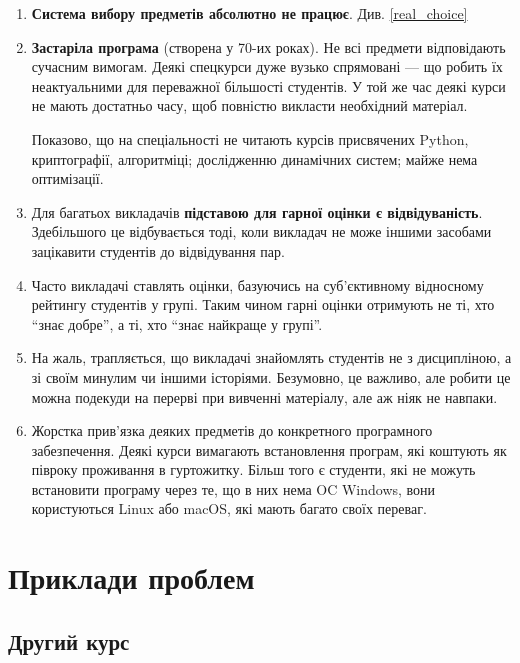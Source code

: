 \documentclass[14pt, a4paper]{extarticle}  %
\begin{document}
\begin{enumerate}
    \item \textbf{Система вибору предметів абсолютно не працює}. Див. \ref{real_choice}
    
    \item \textbf{Застаріла програма} (створена у 70-их роках). Не всі предмети відповідають сучасним вимогам. Деякі спецкурси дуже вузько спрямовані --- що робить їх неактуальними для переважної більшості студентів. У той же час деякі курси не мають достатньо часу, щоб повністю викласти необхідний матеріал. 
    
    Показово, що на спеціальності не читають курсів присвячених Python, криптографії, алгоритміці; дослідженню динамічних систем; майже нема оптимізації. 
    
    \item  Для багатьох викладачів \textbf{підставою для гарної оцінки є відвідуваність}. Здебільшого це відбувається тоді, коли викладач не може іншими засобами зацікавити студентів до відвідування пар. 
    
    \item Часто викладачі ставлять оцінки, базуючись на суб'єктивному відносному рейтингу студентів у групі. Таким чином гарні оцінки отримують не ті, хто ``знає добре'', а ті, хто ``знає найкраще у групі''.
    
    \item На жаль, трапляється, що викладачі знайомлять студентів не з дисципліною, а зі своїм минулим чи іншими історіями. Безумовно, це важливо, але робити це можна подекуди на перерві при вивченні матеріалу, але аж ніяк не навпаки.
    
    \item Жорстка прив'язка деяких предметів до конкретного програмного забезпечення. Деякі курси вимагають встановлення програм, які коштують як півроку проживання в гуртожитку. Більш того є студенти, які не можуть встановити програму через те, що в них нема OC Windows, вони користуються Linux або macOS, які мають багато своїх переваг.
\end{enumerate}

\newpage
\section{Приклади проблем}
\subsection{Другий курс}
\end{document}
